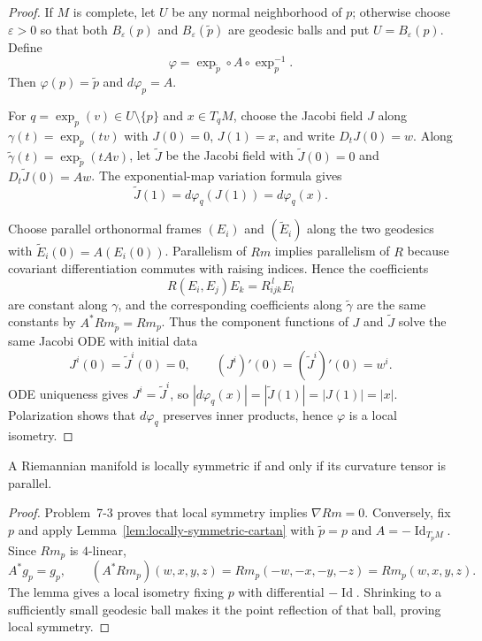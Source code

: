 \begin{proof}
\sketch If $M$ is complete, let $U$ be any normal neighborhood of $p$;
otherwise choose $\varepsilon>0$ so that both
$B_\varepsilon(p)$ and $B_\varepsilon(\widetilde p)$ are geodesic balls and
put $U=B_\varepsilon(p)$. Define
\[
\varphi=\exp_{\widetilde p}\circ A\circ\exp_p^{-1}.
\]
Then $\varphi(p)=\widetilde p$ and $d\varphi_p=A$.

For $q=\exp_p(v)\in U\setminus\{p\}$ and $x\in T_qM$, choose the Jacobi field
$J$ along $\gamma(t)=\exp_p(tv)$ with $J(0)=0$, $J(1)=x$, and write
$D_tJ(0)=w$. Along
$\widetilde\gamma(t)=\exp_{\widetilde p}(tA v)$, let
$\widetilde J$ be the Jacobi field with
$\widetilde J(0)=0$ and $D_t\widetilde J(0)=Aw$. The exponential-map
variation formula gives
\[
\widetilde J(1)=d\varphi_q(J(1))=d\varphi_q(x).
\]

Choose parallel orthonormal frames $(E_i)$ and $(\widetilde E_i)$ along the
two geodesics with $\widetilde E_i(0)=A(E_i(0))$. Parallelism of $Rm$ implies
parallelism of $R$ because covariant differentiation commutes with raising
indices. Hence the
coefficients
\[
R(E_i,E_j)E_k=R_{ijk}^{\,l}E_l
\]
are constant along $\gamma$, and the corresponding coefficients along
$\widetilde\gamma$ are the same constants by $A^*Rm_{\widetilde p}=Rm_p$.
Thus the component functions of $J$ and $\widetilde J$ solve the same Jacobi
ODE with initial data
\[
J^i(0)=\widetilde J^i(0)=0,
\qquad
(J^i)'(0)=(\widetilde J^i)'(0)=w^i.
\]
ODE uniqueness gives $J^i=\widetilde J^i$, so
$|d\varphi_q(x)|=|\widetilde J(1)|=|J(1)|=|x|$. Polarization shows that
$d\varphi_q$ preserves inner products, hence $\varphi$ is a local isometry.
\end{proof}

\begin{theorem}
\label{thm:characterization-locally-symmetric-spaces}

A Riemannian manifold is locally symmetric if and only if its curvature
tensor is parallel.

\begin{proof}
\sketch Problem~7-3 proves that local symmetry implies $\nabla Rm=0$.
Conversely, fix $p$ and apply
Lemma~\ref{lem:locally-symmetric-cartan} with $\widetilde p=p$ and
$A=-\operatorname{Id}_{T_pM}$. Since $Rm_p$ is $4$-linear,
\[
A^*g_p=g_p,
\qquad
(A^*Rm_p)(w,x,y,z)=Rm_p(-w,-x,-y,-z)=Rm_p(w,x,y,z).
\]
The lemma gives a local isometry fixing $p$ with differential
$-\operatorname{Id}$. Shrinking to a sufficiently small geodesic ball makes
it the point reflection of that ball, proving local symmetry.
\end{proof}
\end{theorem}

